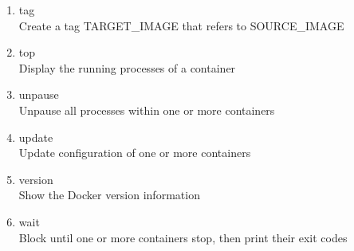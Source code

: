 \begin{enumerate}
\item tag         \\
    Create a tag TARGET\_IMAGE that refers to SOURCE\_IMAGE
\item top         \\
    Display the running processes of a container
\item unpause     \\
    Unpause all processes within one or more containers
\item update      \\
    Update configuration of one or more containers
\item version     \\
    Show the Docker version information
\item wait        \\
    Block until one or more containers stop, then print their exit codes
\end{enumerate}


\newpage